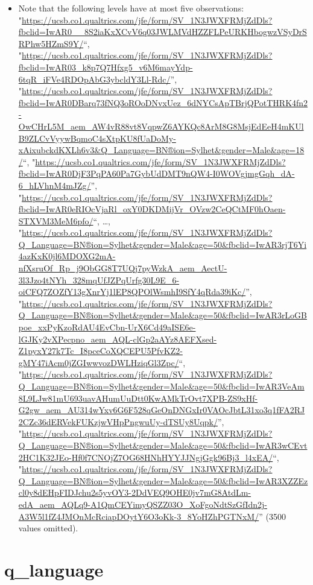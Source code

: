 \documentclass[
]{report}
\providecommand{\tightlist}{%
  \setlength{\itemsep}{0pt}\setlength{\parskip}{0pt}}
\begin{document}
\begin{itemize}
\tightlist
\item
  Note that the following levels have at most five observations:
  "\url{https://ucsb.co1.qualtrics.com/jfe/form/SV_1N3JWXFRMjZdDls?fbclid=IwAR0__8S2iaKxXCvV6q03JWLMVdHZZFLPeURKHbogwzVSyDrSRPhw5HZmS9Y/}``,
  "\url{https://ucsb.co1.qualtrics.com/jfe/form/SV_1N3JWXFRMjZdDls?fbclid=IwAR03_k8p7Q7Hfxg5_v6M6mayYdp-6tqR_iFVe4RDOpAbG3ybcldY3Ll-Rdc/}'',
  "\url{https://ucsb.co1.qualtrics.com/jfe/form/SV_1N3JWXFRMjZdDls?fbclid=IwAR0DBarq73fNQ3oROoDNvxUez_6dNYCsApTBrjQPotTHRK4fn2-OwCHrL5M_aem_AW4vR88vt8VqpwZ6AYKQc8ArM8G8MsjEdEeH4mKUlB9ZLCvVyywBqmoC4sXtpKU8fUaDoMy-xAixubckdKXLh6v3\&Q_Language=BN®ion=Sylhet\&gender=Male\&age=18/}``,
  "\url{https://ucsb.co1.qualtrics.com/jfe/form/SV_1N3JWXFRMjZdDls?fbclid=IwAR0DjF3PqPA60Pa7GybUdDMT9nQW4-I0WOVgjmgGqh_dA-6_hLVhnM4mJZg/}'',
  "\url{https://ucsb.co1.qualtrics.com/jfe/form/SV_1N3JWXFRMjZdDls?fbclid=IwAR0eRIOcVjaRl_oxY0DKDMijVr_OVzw2CeQCtMF0hOaen-STXVM3MeM6pfo/}``,
  \ldots,
  "\url{https://ucsb.co1.qualtrics.com/jfe/form/SV_1N3JWXFRMjZdDls?Q_Language=BN®ion=Sylhet\&gender=Male\&age=50\&fbclid=IwAR3rjT6Yi4azKxK0jl6MDOXG2mA-nfXsruOf_Rp_j9ObGG8T7UQj7pyWzkA_aem_AectU-3l3Jzo4tNYh_328mqUfJZPqUrfg30L9E_6-oiCFQ7ZOZfY13gXnrYj1lEP8QPOlWsmhI9SfY4qRda39iKc/}'',
  "\url{https://ucsb.co1.qualtrics.com/jfe/form/SV_1N3JWXFRMjZdDls?Q_Language=BN®ion=Sylhet\&gender=Male\&age=50\&fbclid=IwAR3rLoGBpoe_xxPyKzoRdAU4EvCbn-UrX6Cd49aISE6e-lGJKy2vXPecpno_aem_AQL-clGp2aAYz8AEFXsed-Z1pyxY27k7Tc_I8pceCoXQCEPU5PfvKZ2-gMY47iAcm0jZGIwwvozDWLHziqGl3Zpc/}``,
  "\url{https://ucsb.co1.qualtrics.com/jfe/form/SV_1N3JWXFRMjZdDls?Q_Language=BN®ion=Sylhet\&gender=Male\&age=50\&fbclid=IwAR3VeAm8L9LJw81mU693uavAHumUuDtt0KwAMkTrOvt7XPB-ZS9xHf-G2gw_aem_AU314wYxv6G6F528qGeOnDNGxIr0VAOcJbtL31xo3q1fFA2RJ2CZc36dERVekFUKzjwVHpPngwuUy-dTSUy8Uqpk/}'',
  "\url{https://ucsb.co1.qualtrics.com/jfe/form/SV_1N3JWXFRMjZdDls?Q_Language=BN®ion=Sylhet\&gender=Male\&age=50\&fbclid=IwAR3wCEvt2HC1K32JEo-Hf0f7CNOjZ7OG68HNhHYYJJNgjGgk96Bj3_l4xEA/}``,
  "\url{https://ucsb.co1.qualtrics.com/jfe/form/SV_1N3JWXFRMjZdDls?Q_Language=BN®ion=Sylhet\&gender=Male\&age=50\&fbclid=IwAR3XZZEzcl0y8dEHpFIDJchu2s5yvOY3-2DdVEQ9OHE0jv7mG8AtdLm-edA_aem_AQLq9-A1QmCEYimyQSZZ03O_XoFgoNdtSzGfIdn2j-A3W5l1fZ4JMOnMcRciapDOytY6O3oKk-3_8YoHZhPGTNxM/}''
  (3500 values omitted).
\end{itemize}

\noindent\makebox[\linewidth]{\rule{\textwidth}{0.4pt}}

\hypertarget{q_language}{%
\section{q\_language}\label{q_language}}
\end{document}
